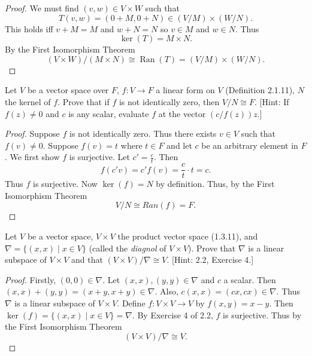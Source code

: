 \begin{proof}
    We must find $(v, w) \in V \times W$ such that 
    \[
        T(v, w) = (0 + M, 0 + N) \in (V / M) \times (W / N).
    \]
    This holds iff $v + M = M$ and $w + N = N$ so
    $v \in M$ and $w \in N$. Thus
    \[
        \ker(T) = M \times N.
    \]
    By the First Isomorphism Theorem
    \[
        (V \times W) / (M \times N) \cong \operatorname{Ran}(T) = (V / M) \times (W / N).
    \]
\end{proof}

\newpage
\begin{tcolorbox}[title=Problem 3, breakable]
    Let $V$ be a vector space over $F$, $f : V \longrightarrow F$ a linear form on $V$ (Definition 2.1.11),
    $N$ the kernel of $f$. Prove that if $f$ is not identically zero, then $V / N \cong F$.
    [Hint: If $f(z) \ne 0$ and $c$ is any scalar, evaluate $f$ at the vector $(c / f(z))z$.]
\end{tcolorbox}

\begin{proof}
    Suppose $f$ is not identically zero.
    Thus there exists $v \in V$ such that $f(v) \ne 0$.
    Suppose $f(v) = t$ where $t \in F$ and let $c$ be an arbitrary element in $F$.
    We first show $f$ is surjective.
    Let $c' = \frac{c}{t}$. Then
    \[
        f(c'v) = c' f(v) = \frac{c}{t} \cdot t = c.
    \]
    Thus $f$ is surjective.
    Now $\ker(f) = N$ by definition. Thus, by the First Isomorphism Theorem
    \[
        V/N \cong Ran(f) = F.
    \]
\end{proof}

\begin{tcolorbox}[title=Problem 4, breakable]
    Let $V$ be a vector space, $V \times V$ the product vector space (1.3.11),
    and $\nabla = \{(x, x) \mid x \in V\}$ (called the \emph{diagnol} of $V \times V$).
    Prove that $\nabla$ is a linear subspace of $V \times V$ and that $(V \times V)/\nabla \cong V$.
    [Hint: 2.2, Exercise 4.]
\end{tcolorbox}

\begin{proof}
    Firstly, $(0, 0) \in \nabla$.
    Let $(x, x), (y, y) \in \nabla$ and $c$ a scalar.
    Then $(x, x) + (y, y) = (x + y, x + y) \in \nabla$.
    Also, $c(x, x) = (cx, cx) \in \nabla$.
    Thus $\nabla$ is a linear subspace of $V \times V$.
    Define $f : V \times V \to V$ by $f(x,y) = x - y$.
    Then $\ker(f) = \{(x,x) \mid x \in V\} = \nabla$.
    By Exercise 4 of 2.2, $f$ is surjective. Thus by the First Isomorphism Theorem
    \[
        (V \times V)/\nabla \cong V.
    \]
\end{proof}

